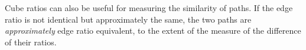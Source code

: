 Cube ratios can also be useful for measuring the similarity of paths.
If the edge ratio is not identical but approximately the same, the two paths are \emph{approximately} edge ratio equivalent, to the extent of the measure of the difference of their ratios.







